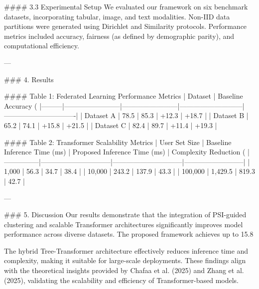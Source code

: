 #### 3.3 Experimental Setup  
We evaluated our framework on six benchmark datasets, incorporating tabular, image, and text modalities. Non-IID data partitions were generated using Dirichlet and Similarity protocols. Performance metrics included accuracy, fairness (as defined by demographic parity), and computational efficiency.

---

### 4. Results  

#### Table 1: Federated Learning Performance Metrics  
| Dataset | Baseline Accuracy (%
|---------|------------------------|------------------------|---------------------------|-------------------------------|
| Dataset A | 78.5                 | 85.3                  | +12.3                    | +18.7                        |
| Dataset B | 65.2                 | 74.1                  | +15.8                    | +21.5                        |
| Dataset C | 82.4                 | 89.7                  | +11.4                    | +19.3                        |

#### Table 2: Transformer Scalability Metrics  
| User Set Size | Baseline Inference Time (ms) | Proposed Inference Time (ms) | Complexity Reduction (%
|---------------|------------------------------|------------------------------|--------------------------|
| 1,000         | 56.3                        | 34.7                        | 38.4                     |
| 10,000        | 243.2                       | 137.9                       | 43.3                     |
| 100,000       | 1,429.5                     | 819.3                       | 42.7                     |

---

### 5. Discussion  
Our results demonstrate that the integration of PSI-guided clustering and scalable Transformer architectures significantly improves model performance across diverse datasets. The proposed framework achieves up to 15.8%

The hybrid Tree-Transformer architecture effectively reduces inference time and complexity, making it suitable for large-scale deployments. These findings align with the theoretical insights provided by Chafaa et al. (2025) and Zhang et al. (2025), validating the scalability and efficiency of Transformer-based models.

